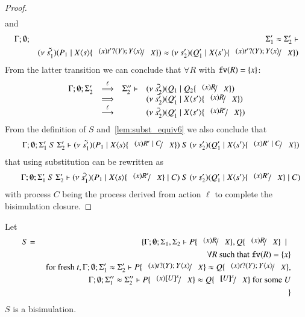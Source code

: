 \begin{proof}
\[\begin{array}{rcll}
	\end{array}
\]
%
	\noi and
%
	\begin{eqnarray}
		\Gamma; \es; &&\Sigma_1' \wb \Sigma_2' \proves \\
		&&\newsp{\tilde{s_1'}}{P_1 \Par \appl{X}{s} \subst{(x) \binp{t'}{Y} \appl{Y}{x}}{X}} \wb \newsp{s_2'}{Q_1' \Par \appl{X}{s'} \subst{(x) \binp{t'}{Y} \appl{Y}{x}}{X}}
		\label{lem:subst_equiv6}
	\end{eqnarray} 
%
	\noi From the latter transition we can conclude that $\forall R$ with $\mathtt{fv}(R) = \{x\}$:
%
\[
	\begin{array}{rcll}
		\Gamma; \es; \Sigma_2' &\By{\ell}& \Sigma_2'' \proves &
		\newsp{\tilde{s_2'}}{Q_1 \Par Q_2 \subst{(x) R}{X}}\\
		&\By{}& &
		\newsp{\tilde{s_2'}}{Q_1' \Par \appl{X}{s'} \subst{(x) R}{X}} \\
		&\by{\ell}& &
		\newsp{\tilde{s_2'}}{Q_1' \Par \appl{X}{s'} \subst{(x) R'}{X}} \\
	\end{array}
\]
%
	\noi From the definition of $S$ and~\ref{lem:subst_equiv6}
	we also conclude that
	\begin{eqnarray*}
		&&\Gamma; \es; \Sigma_1'\ S\ \Sigma_2' \proves 
		\newsp{\tilde{s_1'}}{P_1 \Par \appl{X}{s} \subst{(x) R' \Par C}{X}}\ S\ \newsp{s_2'}{Q_1' \Par \appl{X}{s'} \subst{(x) R' \Par C}{X}}
	\end{eqnarray*}
	\noi that using substitution can be rewritten as
	\begin{eqnarray*}
		&&\Gamma; \es; \Sigma_1'\ S\ \Sigma_2' \proves 
		\newsp{\tilde{s_1'}}{P_1 \Par \appl{X}{s} \subst{(x) R'}{X} \Par C}\ S\ \newsp{s_2'}{Q_1' \Par \appl{X}{s'} \subst{(x) R'}{X} \Par C}
	\end{eqnarray*}
	\noi with process $C$ being the process derived from action $\ell$
	to complete the bisimulation closure.
\end{proof}

\begin{corollary}\rm
	\label{cor:subst_equiv}
	Let
	\begin{eqnarray*}
		S &=& \set{ \Gamma; \es; \Sigma_1, \Sigma_2 \proves P \subst{(x) R}{X}, Q \subst{(x) R}{X} \setbar \\
		&& \forall R \textrm{ such that } \fv{R} = \set{x}\\
		&& \textrm{ for fresh } t,  \Gamma; \es; \Sigma_1' \wb \Sigma_2' \proves P \subst{(x) \binp{t}{Y} \appl{Y}{x}}{X} \wb Q \subst{(x) \binp{t}{Y} \appl{Y}{x}}{X}, \\
		&& \Gamma; \es; \Sigma_1'' \wb \Sigma_2'' \proves P \subst{(x) \map{U}^x}{X} \wb Q \subst{\map{U}^x}{X} \textrm{ for some } U \\
		&&}
	\end{eqnarray*}
	$S$ is a bisimulation.
\end{corollary}

